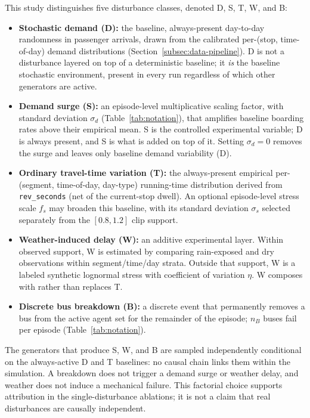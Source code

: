 This study distinguishes five disturbance classes, denoted D, S, T, W, and B:

\begin{itemize}
\item \textbf{Stochastic demand (D):} the baseline, always-present day-to-day randomness in passenger arrivals, drawn from the calibrated per-(stop, time-of-day) demand distributions (Section~\ref{subsec:data-pipeline}). D is not a disturbance layered on top of a deterministic baseline; it \textit{is} the baseline stochastic environment, present in every run regardless of which other generators are active.
\item \textbf{Demand surge (S):} an episode-level multiplicative scaling factor, with standard deviation $\sigma_d$ (Table~\ref{tab:notation}), that amplifies baseline boarding rates above their empirical mean. S is the controlled experimental variable; D is always present, and S is what is added on top of it. Setting $\sigma_d = 0$ removes the surge and leaves only baseline demand variability (D).
\item \textbf{Ordinary travel-time variation (T):} the always-present empirical per-(segment, time-of-day, day-type) running-time distribution derived from \texttt{rev\_seconds} (net of the current-stop dwell). An optional episode-level stress scale $f_s$ may broaden this baseline, with its standard deviation $\sigma_s$ selected separately from the $[0.8,1.2]$ clip support.
\item \textbf{Weather-induced delay (W):} an additive experimental layer. Within observed support, W is estimated by comparing rain-exposed and dry observations within segment/time/day strata. Outside that support, W is a labeled synthetic lognormal stress with coefficient of variation $\eta$. W composes with rather than replaces T.
\item \textbf{Discrete bus breakdown (B):} a discrete event that permanently removes a bus from the active agent set for the remainder of the episode; $n_B$ buses fail per episode (Table~\ref{tab:notation}).
\end{itemize}

The generators that produce S, W, and B are sampled independently conditional on the always-active D and T baselines: no causal chain links them within the simulation. A breakdown does not trigger a demand surge or weather delay, and weather does not induce a mechanical failure. This factorial choice supports attribution in the single-disturbance ablations; it is not a claim that real disturbances are causally independent.

